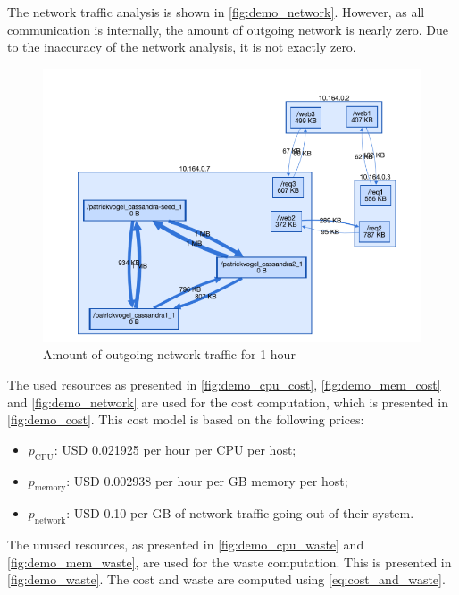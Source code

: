 \noindent
The network traffic analysis is shown in \autoref{fig:demo_network}. However, as all communication is internally, the amount of outgoing network is nearly zero. Due to the inaccuracy of the network analysis, it is not exactly zero.\\

\begin{figure}
    \centering
    \includegraphics[width=\textwidth]{gfx/demo_network}
    \caption{Amount of outgoing network traffic for 1 hour}
    \label{fig:demo_network}
\end{figure}

\noindent
The used resources as presented in \autoref{fig:demo_cpu_cost}, \autoref{fig:demo_mem_cost} and \autoref{fig:demo_network} are used for the cost computation, which is presented in \autoref{fig:demo_cost}. This cost model is based on the following prices:
\begin{itemize}
    \item $p_\text{CPU}$: USD 0.021925 per hour per CPU per host;
    \item $p_\text{memory}$: USD 0.002938 per hour per GB memory per host;
    \item $p_\text{network}$: USD 0.10 per GB of network traffic going out of their system.
\end{itemize}

\noindent
The unused resources, as presented in \autoref{fig:demo_cpu_waste} and \autoref{fig:demo_mem_waste}, are used for the waste computation. This is presented in \autoref{fig:demo_waste}. The cost and waste are computed using \autoref{eq:cost_and_waste}.\\

